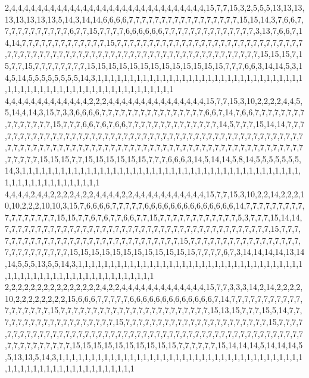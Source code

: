 2,4,4,4,4,4,4,4,4,4,4,4,4,4,4,4,4,4,4,4,4,4,4,4,4,4,4,4,4,4,4,15,7,7,15,3,2,5,5,5,13,13,13,13,13,13,13,13,5,14,3,14,14,6,6,6,6,7,7,7,7,7,7,7,7,7,7,7,7,7,7,7,7,7,15,15,14,3,7,6,6,7,7,7,7,7,7,7,7,7,7,7,6,7,7,15,7,7,7,7,6,6,6,6,6,6,7,7,7,7,7,7,7,7,7,7,7,7,7,7,3,13,7,6,6,7,14,14,7,7,7,7,7,7,7,7,7,7,7,7,7,15,7,7,7,7,7,7,7,7,7,7,7,7,7,7,7,7,7,7,7,7,7,7,7,7,7,7,7,7,7,7,7,7,7,7,7,7,7,7,7,7,7,7,7,7,7,7,7,7,7,7,7,7,7,7,7,7,7,7,7,7,7,7,7,7,7,7,7,7,15,15,15,7,15,7,7,15,7,7,7,7,7,7,7,7,15,15,15,15,15,15,15,15,15,15,15,15,15,7,7,7,6,6,3,14,14,5,3,14,5,14,5,5,5,5,5,5,5,5,14,3,1,1,1,1,1,1,1,1,1,1,1,1,1,1,1,1,1,1,1,1,1,1,1,1,1,1,1,1,1,1,1,1,1,1,1,1,1,1,1,1,1,1,1,1,1,1,1,1,1,1,1,1,1,1,1,1,1,1
4,4,4,4,4,4,4,4,4,4,4,4,4,2,2,2,4,4,4,4,4,4,4,4,4,4,4,4,4,4,4,15,7,7,15,3,10,2,2,2,2,4,4,5,5,14,4,14,3,15,7,3,3,6,6,6,6,7,7,7,7,7,7,7,7,7,7,7,7,7,7,7,7,6,6,7,14,7,6,6,7,7,7,7,7,7,7,7,7,7,7,7,7,7,7,15,7,7,7,6,6,7,6,7,6,6,7,7,7,7,7,7,7,7,7,7,7,7,7,7,14,5,7,7,7,15,14,14,7,7,7,7,7,7,7,7,7,7,7,7,7,7,7,7,7,7,7,7,7,7,7,7,7,7,7,7,7,7,7,7,7,7,7,7,7,7,7,7,7,7,7,7,7,7,7,7,7,7,7,7,7,7,7,7,7,7,7,7,7,7,7,7,7,7,7,7,7,7,7,7,7,7,7,7,7,7,7,7,7,7,7,7,7,7,7,7,7,7,7,7,7,7,7,7,7,7,7,7,15,15,15,7,7,15,15,15,15,15,15,7,7,7,6,6,6,3,14,5,14,14,5,8,14,5,5,5,5,5,5,5,14,3,1,1,1,1,1,1,1,1,1,1,1,1,1,1,1,1,1,1,1,1,1,1,1,1,1,1,1,1,1,1,1,1,1,1,1,1,1,1,1,1,1,1,1,1,1,1,1,1,1,1,1,1,1,1,1,1,1,1
4,4,4,4,2,4,4,2,2,2,2,4,2,2,4,4,4,4,2,2,4,4,4,4,4,4,4,4,4,4,4,15,7,7,15,3,10,2,2,14,2,2,2,10,10,2,2,2,10,10,3,15,7,6,6,6,6,7,7,7,7,7,6,6,6,6,6,6,6,6,6,6,6,6,6,6,14,7,7,7,7,7,7,7,7,7,7,7,7,7,7,7,7,7,15,15,7,7,6,7,6,7,7,6,6,7,7,15,7,7,7,7,7,7,7,7,7,7,7,7,5,3,7,7,7,15,14,14,7,7,7,7,7,7,7,7,7,7,7,7,7,7,7,7,7,7,7,7,7,7,7,7,7,7,7,7,7,7,7,7,7,7,7,7,7,7,7,7,7,15,7,7,7,7,7,7,7,7,7,7,7,7,7,7,7,7,7,7,7,7,7,7,7,7,7,7,7,7,7,7,15,7,7,7,7,7,7,7,7,7,7,7,7,7,7,7,7,7,7,7,7,7,7,7,7,7,7,7,15,15,15,15,15,15,15,15,15,15,15,15,7,7,7,7,6,7,3,14,14,14,14,13,14,14,5,5,5,13,5,5,14,3,1,1,1,1,1,1,1,1,1,1,1,1,1,1,1,1,1,1,1,1,1,1,1,1,1,1,1,1,1,1,1,1,1,1,1,1,1,1,1,1,1,1,1,1,1,1,1,1,1,1,1,1,1,1,1,1,1,1
2,2,2,2,2,2,2,2,2,2,2,2,2,2,2,4,2,2,4,4,4,4,4,4,4,4,4,4,4,4,4,15,7,7,3,3,3,14,2,14,2,2,2,2,10,2,2,2,2,2,2,2,2,15,6,6,6,7,7,7,7,7,6,6,6,6,6,6,6,6,6,6,6,6,6,7,14,7,7,7,7,7,7,7,7,7,7,7,7,7,7,7,7,7,7,15,7,7,7,7,7,7,7,7,7,7,7,7,7,7,7,7,7,7,7,7,7,7,7,15,13,15,7,7,7,15,5,14,7,7,7,7,7,7,7,7,7,7,7,7,7,7,7,7,7,7,7,15,7,7,7,7,7,7,7,7,7,7,7,7,7,7,7,7,7,7,7,7,7,7,15,7,7,7,7,7,7,7,7,7,7,7,7,7,7,7,7,7,7,7,7,7,7,7,7,7,7,7,7,7,7,7,7,7,7,7,7,7,7,7,7,7,7,7,7,7,7,7,7,7,7,7,7,7,7,7,7,7,7,7,7,15,15,15,15,15,15,15,15,15,15,7,7,7,7,7,7,15,14,14,14,5,14,14,14,5,5,13,13,5,14,3,1,1,1,1,1,1,1,1,1,1,1,1,1,1,1,1,1,1,1,1,1,1,1,1,1,1,1,1,1,1,1,1,1,1,1,1,1,1,1,1,1,1,1,1,1,1,1,1,1,1,1,1,1,1,1,1,1,1
